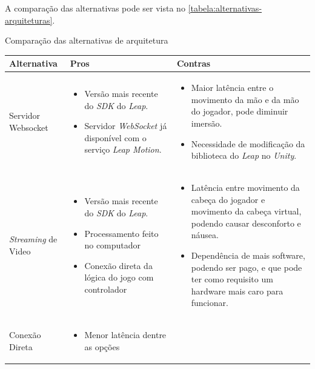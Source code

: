 A comparação das alternativas pode ser vista no \autoref{tabela:alternativas-arquiteturas}.

\begin{quadro}[htb] \scriptsize
	\centering
	\caption[Comparação das alternativas de arquitetura]{Comparação das alternativas de arquitetura}
		
	\begin{tabular}{|>{\centering\arraybackslash}m{2.1cm}|>{\centering\arraybackslash}m{6cm}|>{\centering\arraybackslash}m{6cm}|}
		\hline 
		\textbf{Alternativa} & \textbf{Pros} & \textbf{Contras} \\
		\hline 
		Servidor Websocket
		&\begin{itemize}[label={},leftmargin=1mm]
			\item Versão mais recente do \textit{SDK} do \textit{Leap}.
			\item Servidor \textit{WebSocket} já disponível com o serviço \textit{Leap Motion}.
		\end{itemize}
		&\begin{itemize}[label={},leftmargin=1mm]
			\item Maior latência entre o movimento da mão e da mão do jogador, pode diminuir imersão.
			\item Necessidade de modificação da biblioteca do \textit{Leap} no \textit{Unity}.
		\end{itemize}
		\\ \hline 
		\textit{Streaming} de Video
		&\begin{itemize}[label={},leftmargin=1mm]
			\item Versão mais recente do \textit{SDK} do \textit{Leap}.
			\item Processamento feito no computador
			\item Conexão direta da lógica do jogo com controlador
		\end{itemize}
		&\begin{itemize}[label={},leftmargin=1mm]
			\item Latência entre movimento da cabeça do jogador e movimento da cabeça virtual, podendo causar desconforto e náusea.
			\item Dependência de mais software, podendo ser pago, e que pode ter como requisito um hardware mais caro para funcionar.
		\end{itemize}
	    \\ \hline 
		Conexão Direta
		&\begin{itemize}[label={},leftmargin=1mm]
				\item Menor latência dentre as opções

\end{itemize}
\end{tabular}
\end{quadro}
